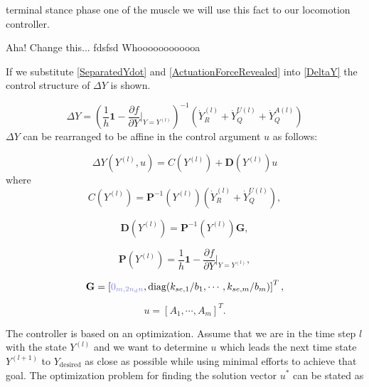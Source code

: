 \documentclass[a4paper,10pt]{article}
\newcommand{\zm}[1]{\ensuremath{ {\color{opaqueblue} 0_{#1} } }}
\begin{document}
terminal stance phase one
of the muscle  we will use this fact
to our locomotion controller.

Aha!
Change this...
fdsfsd
Whoooooooooooa~


If we substitute \eqref{SeparatedYdot} and \eqref{ActuationForceRevealed} into
\eqref{DeltaY} the control structure of $\Delta Y$ is shown.

\begin{equation}\label{DeltaYControl}
\Delta Y = \left(  \frac{1}{h}\mathbf{1} - {\frac{\partial f}{\partial Y} \bigg|_{Y=Y^{(l)}}}\right)^{-1} 
            \left( \dot{Y}_R^{(l)} + \dot{Y}_Q^{U(l)} + \dot{Y}_Q^{A(l)} \right)
\end{equation}
$\Delta Y$ can be rearranged to be affine in the control argument $u$ as follows:

\begin{equation}
\Delta Y(Y^{(l)}, u) = C(Y^{(l)}) + \mathbf{D}(Y^{(l)})u
\end{equation}
where
\begin{equation}
C(Y^{(l)}) = \mathbf{P}^{-1}(Y^{(l)}) \left( \dot{Y}_R^{(l)} + \dot{Y}_Q^{U(l)} \right),
\end{equation}

\begin{equation}
\mathbf{D}(Y^{(l)}) = \mathbf{P}^{-1}(Y^{(l)}) \mathbf{G},
\end{equation}

\begin{equation}\label{DeltaYMatrix}
\mathbf{P}(Y^{(l)}) = \frac{1}{h}\mathbf{1} - {\frac{\partial f}{\partial Y} \bigg|_{Y=Y^{(l)}}},
\end{equation}

\begin{equation}
\mathbf{G} = \left[ \zm{m, 2n_d n} , \text{diag}(k_{se,1}/b_1, \cdots, k_{se,m}/b_m) \right]^T,
\end{equation}

\begin{equation}
u = [A_1, \cdots, A_m]^T.
\end{equation}

The controller is based on an optimization. Assume that we are in
the time step $l$ with the state $Y^{(l)}$ and we want to determine $u$
which leads the next time state $Y^{(l+1)}$ to $Y_{\text{desired}}$
as close as possible while using minimal efforts to achieve that goal.
The optimization problem for finding the solution vector $u^*$ can be stated as
\end{document}
